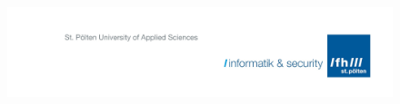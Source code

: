 


\pagestyle{empty}

\begin{figure}[H]
\vspace*{-2.5cm}
\hspace*{2.5cm}
\includegraphics[keepaspectratio, width=1.4\textwidth, right]{TemplateElements/logo_info_sec.png}
\end{figure}



